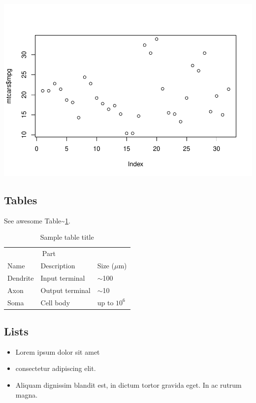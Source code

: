 \documentclass{article}
\begin{document}
\includegraphics{paper_files/figure-latex/unnamed-chunk-6-1.pdf}

\hypertarget{tables}{%
\subsection{Tables}\label{tables}}

\lipsum[12]

See awesome Table\textasciitilde{}\ref{tab:table}.

\begin{table}
 \caption{Sample table title}
  \centering
  \begin{tabular}{lll}
    \toprule
    \multicolumn{2}{c}{Part}                   \\
    \cmidrule(r){1-2}
    Name     & Description     & Size ($\mu$m) \\
    \midrule
    Dendrite & Input terminal  & $\sim$100     \\
    Axon     & Output terminal & $\sim$10      \\
    Soma     & Cell body       & up to $10^6$  \\
    \bottomrule
  \end{tabular}
  \label{tab:table}
\end{table}

\hypertarget{lists}{%
\subsection{Lists}\label{lists}}

\begin{itemize}
\tightlist
\item
  Lorem ipsum dolor sit amet
\item
  consectetur adipiscing elit.
\item
  Aliquam dignissim blandit est, in dictum tortor gravida eget. In ac
  rutrum magna.
\end{itemize}
\end{document}

